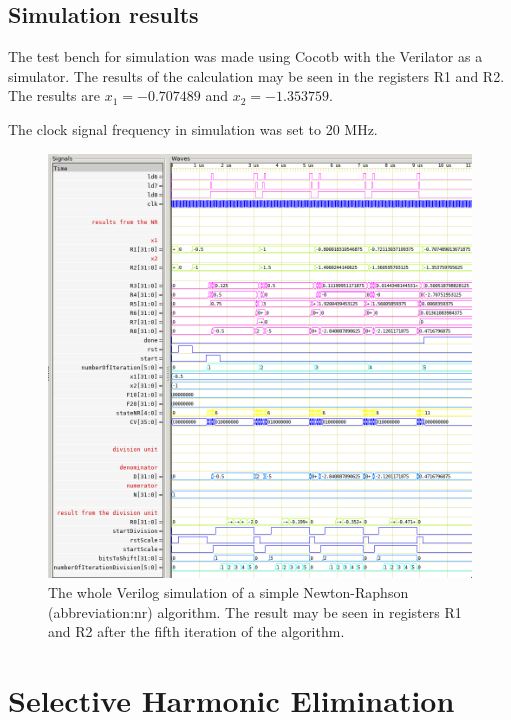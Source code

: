 \documentclass[a4paper, twoside, 11pt]{article}
\begin{document}
    \subsection{Simulation results}
        The test bench for simulation was made using Cocotb \cite{cocotb} with the Verilator \cite{verilator} as a simulator. The results of the calculation may be seen in the registers R1 and R2. The results are $x_1 = - 0.707489$ and $x_2 = - 1.353759$.\par
        The clock signal frequency in simulation was set to 20 MHz.
            \begin{figure}[htbp!]
                \centering
                \includegraphics[width=1\textwidth]{src/png/inverted/simple-nr-sim.png}
                \caption{The whole Verilog simulation of a simple Newton-Raphson (\gls{abbreviation:nr}) algorithm. The result may be seen in registers R1 and R2 after the fifth iteration of the algorithm.}
                \label{fig:simple-nr-sim}
            \end{figure}



\section{Selective Harmonic Elimination}\label{sec:selective-harmonic-elimination}
\end{document}
